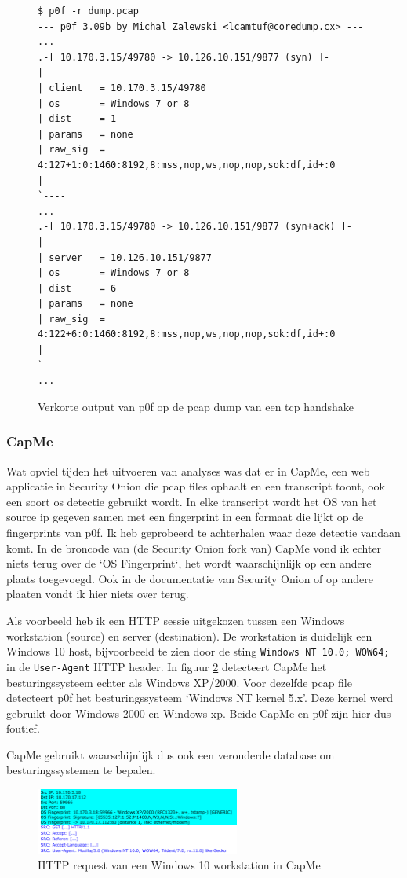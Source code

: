 \documentclass[a4paper,12pt]{report}
\begin{document}
\begin{figure}[H]
  \begin{lstlisting}
$ p0f -r dump.pcap                                           
--- p0f 3.09b by Michal Zalewski <lcamtuf@coredump.cx> ---
...
.-[ 10.170.3.15/49780 -> 10.126.10.151/9877 (syn) ]-
|
| client   = 10.170.3.15/49780
| os       = Windows 7 or 8
| dist     = 1
| params   = none
| raw_sig  = 4:127+1:0:1460:8192,8:mss,nop,ws,nop,nop,sok:df,id+:0
|
`----
...
.-[ 10.170.3.15/49780 -> 10.126.10.151/9877 (syn+ack) ]-
|
| server   = 10.126.10.151/9877
| os       = Windows 7 or 8
| dist     = 6
| params   = none
| raw_sig  = 4:122+6:0:1460:8192,8:mss,nop,ws,nop,nop,sok:df,id+:0
|
`----
...
  \end{lstlisting}
  \caption{Verkorte output van p0f op de pcap dump van een tcp handshake}
  \label{fig:p0f-so-voorbeeld}
\end{figure}

\subsubsection{CapMe}
Wat opviel tijden het uitvoeren van analyses was dat er in CapMe, een web applicatie in Security Onion die pcap files ophaalt en een transcript toont, ook een soort os detectie gebruikt wordt.
In elke transcript wordt het OS van het source ip gegeven samen met een fingerprint in een formaat die lijkt op de fingerprints van p0f.
Ik heb geprobeerd te achterhalen waar deze detectie vandaan komt.
In de broncode van (de Security Onion fork van) CapMe vond ik echter niets terug over de `OS Fingerprint`, het wordt waarschijnlijk op een andere plaats toegevoegd.
Ook in de documentatie van Security Onion of op andere plaaten vondt ik hier niets over terug.

Als voorbeeld heb ik een HTTP sessie uitgekozen tussen een Windows workstation (source) en server (destination).
De workstation is duidelijk een Windows 10 host, bijvoorbeeld te zien door de sting \lstinline|Windows NT 10.0; WOW64;| in de \lstinline|User-Agent| HTTP header.
In figuur \ref{fig:capme-os-detection} detecteert CapMe het besturingssysteem echter als Windows XP/2000.
Voor dezelfde pcap file detecteert p0f het besturingssysteem `Windows NT kernel 5.x'.
Deze kernel werd gebruikt door Windows 2000 en Windows xp.
Beide CapMe en p0f zijn hier dus foutief.

CapMe gebruikt waarschijnlijk dus ook een verouderde database om besturingssystemen te bepalen.

\begin{figure}[H]
  \centering
  \includegraphics[width=0.6\textwidth]{capme-fingerprint}
  \caption{HTTP request van een Windows 10 workstation in CapMe}
  \label{fig:capme-os-detection}
\end{figure}
\end{document}
